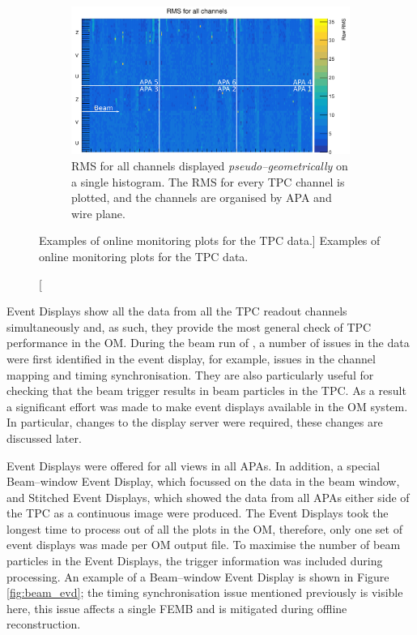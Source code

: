 \begin{figure}
	\begin{subfigure}[b]{0.75\textwidth}
		\centering
		\vspace{3mm}
		\includegraphics[width=\textwidth]{figures/all_chan_rms.png}
		\caption {RMS for all channels displayed \emph{pseudo--geometrically} on a 
		single histogram. The RMS for every TPC channel is plotted, and the channels 
		are organised by APA and wire plane.} 
		\label{fig:ped_noise}
	\end{subfigure}

	\caption
	[Examples of online monitoring plots for the TPC data.]
	{Examples of online monitoring plots for the TPC data.}
	\label{fig:tpc_om}

\end{figure}

Event Displays show all the data from all the TPC readout channels
simultaneously and, as such, they provide the most general check of TPC 
performance in the OM. During the beam run of \protodune{}, a number of issues 
in the data were first identified in the event display, for example, issues in 
the channel mapping and timing synchronisation. They are also particularly 
useful for checking that the beam trigger results in beam particles in the 
TPC. As a result a significant effort was made to make event displays 
available in the \protodune{} OM system. In particular, changes to the display 
server were required, these changes are discussed later. 

Event Displays were offered for all views in all APAs. In addition, a special 
Beam--window Event Display, which focussed on the data in the beam window, and 
Stitched Event Displays, which showed the data from all APAs either side of the
TPC as a continuous image were produced. The Event Displays took the longest 
time to process out of all the plots in the OM, therefore, only one set of 
event displays was made per OM output file. To maximise the number of beam 
particles in the Event Displays, the trigger information was included during 
processing. An example of a Beam--window Event Display is shown in Figure 
\ref{fig:beam_evd}; the timing synchronisation issue mentioned previously is 
visible here, this issue affects a single FEMB and is mitigated during offline 
reconstruction.  

